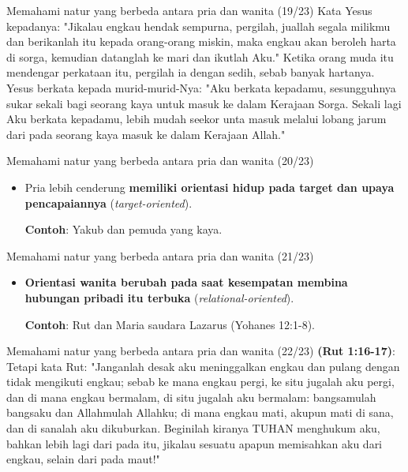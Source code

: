 \documentclass{beamer}
\theoremstyle{mystyle}
\let\emph\relax %
\begin{document}
\begin{frame}{Memahami natur yang berbeda antara pria dan wanita (19/23)}
	Kata Yesus kepadanya: "Jikalau engkau hendak sempurna, pergilah, juallah segala milikmu dan berikanlah itu kepada orang-orang miskin, maka engkau akan beroleh harta di sorga, kemudian datanglah ke mari dan ikutlah Aku." Ketika orang muda itu mendengar perkataan itu, pergilah ia dengan sedih, sebab banyak hartanya. Yesus berkata kepada murid-murid-Nya: "Aku berkata kepadamu, sesungguhnya sukar sekali bagi seorang kaya untuk masuk ke dalam Kerajaan Sorga. Sekali lagi Aku berkata kepadamu, lebih mudah seekor unta masuk melalui lobang jarum dari pada seorang kaya masuk ke dalam Kerajaan Allah."
\end{frame}

\begin{frame}{Memahami natur yang berbeda antara pria dan wanita (20/23)}

	\begin{itemize}
		\item Pria lebih cenderung \textbf{memiliki orientasi hidup pada target dan upaya pencapaiannya} (\textit{target-oriented}).
		
		\bigskip
		
		\textbf{Contoh}: Yakub dan pemuda yang kaya.
						
	\end{itemize}	
\end{frame}

\begin{frame}{Memahami natur yang berbeda antara pria dan wanita (21/23)}
	\begin{itemize}
		\item \textbf{Orientasi wanita berubah pada saat kesempatan membina hubungan pribadi itu terbuka} (\textit{relational-oriented}).
		
		\bigskip		
		
		\textbf{Contoh}: Rut dan Maria saudara Lazarus (Yohanes 12:1-8).		
	\end{itemize}
\end{frame}

\begin{frame}{Memahami natur yang berbeda antara pria dan wanita (22/23)}
	\emph{Rut} \textbf{(Rut 1:16-17)}: Tetapi kata Rut: "Janganlah desak aku meninggalkan engkau dan pulang dengan tidak mengikuti engkau; sebab ke mana engkau pergi, ke situ jugalah aku pergi, dan di mana engkau bermalam, di situ jugalah aku bermalam: bangsamulah bangsaku dan Allahmulah Allahku; di mana engkau mati, akupun mati di sana, dan di sanalah aku dikuburkan. Beginilah kiranya TUHAN menghukum aku, bahkan lebih lagi dari pada itu, jikalau sesuatu apapun memisahkan aku dari engkau, selain dari pada maut!"
\end{frame}
\end{document}
